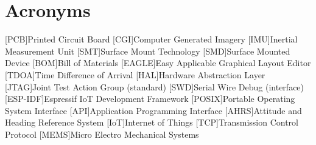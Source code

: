 \chapter{Acronyms}

\begin{acronym}

[PCB]{Printed Circuit Board}
[CGI]{Computer Generated Imagery}
[IMU]{Inertial Measurement Unit}
[SMT]{Surface Mount Technology}
[SMD]{Surface Mounted Device}
[BOM]{Bill of Materials}
[EAGLE]{Easy Applicable Graphical Layout Editor}
[TDOA]{Time Difference of Arrival}
[HAL]{Hardware Abstraction Layer}
[JTAG]{Joint Test Action Group (standard)}
[SWD]{Serial Wire Debug (interface)}
[ESP-IDF]{Espressif IoT Development Framework}
[POSIX]{Portable Operating System Interface}
[API]{Application Programming Interface}
[AHRS]{Attitude and Heading Reference System}
[IoT]{Internet of Things}
[TCP]{Transmission Control Protocol}
[MEMS]{Micro Electro Mechanical Systems}

\end{acronym}
